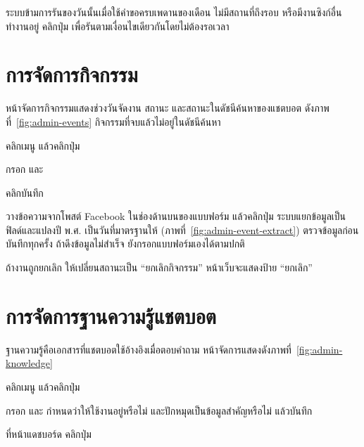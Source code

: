 ระบบข้ามการรันของวันนั้นเมื่อใช้คำขอครบเพดานของเดือน ไม่มีสถานที่ถึงรอบ หรือมีงานซิงก์อื่นทำงานอยู่ คลิกปุ่ม  เพื่อรันตามเงื่อนไขเดียวกันโดยไม่ต้องรอเวลา

\section{การจัดการกิจกรรม}

หน้าจัดการกิจกรรมแสดงช่วงวันจัดงาน สถานะ และสถานะในดัชนีค้นหาของแชตบอต ดังภาพที่~\ref{fig:admin-events} กิจกรรมที่จบแล้วไม่อยู่ในดัชนีค้นหา


\begin{steps}
  \item คลิกเมนู  แล้วคลิกปุ่ม 
  \item กรอก        และ 
  \item คลิกบันทึก
\end{steps}

\begin{tip}
วางข้อความจากโพสต์ Facebook ในช่องด้านบนของแบบฟอร์ม แล้วคลิกปุ่ม  ระบบแยกข้อมูลเป็นฟิลด์และแปลงปี พ.ศ. เป็นวันที่มาตรฐานให้ (ภาพที่~\ref{fig:admin-event-extract}) ตรวจข้อมูลก่อนบันทึกทุกครั้ง ถ้าดึงข้อมูลไม่สำเร็จ ยังกรอกแบบฟอร์มเองได้ตามปกติ
\end{tip}


ถ้างานถูกยกเลิก ให้เปลี่ยนสถานะเป็น ``ยกเลิกกิจกรรม'' หน้าเว็บจะแสดงป้าย ``ยกเลิก''

\section{การจัดการฐานความรู้แชตบอต}
\label{sec:admin-knowledge}

ฐานความรู้คือเอกสารที่แชตบอตใช้อ้างอิงเมื่อตอบคำถาม หน้าจัดการแสดงดังภาพที่~\ref{fig:admin-knowledge}


\begin{steps}
  \item คลิกเมนู  แล้วคลิกปุ่ม 
  \item กรอก   และ  กำหนดว่าให้ใช้งานอยู่หรือไม่ และปักหมุดเป็นข้อมูลสำคัญหรือไม่ แล้วบันทึก
  \item ที่หน้าแดชบอร์ด คลิกปุ่ม 
\end{steps}


